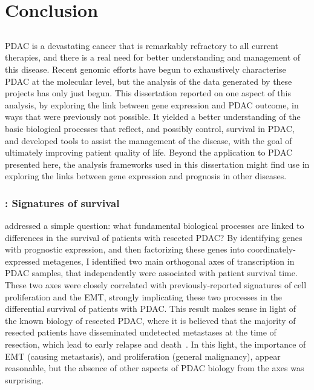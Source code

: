 \documentclass[thesis.tex]{subfiles}
\begin{document}
\chapter[Conclusion]{Conclusion}
\label{chap:conc}

\section*{}

\Acrlong{PDAC} is a devastating cancer that is remarkably refractory to all current therapies, and there is a real need for better understanding and management of this disease.  Recent genomic efforts have begun to exhaustively characterise \gls{PDAC} at the molecular level, but the analysis of the data generated by these projects has only just begun.  This dissertation reported on one aspect of this analysis, by exploring the link between gene expression and \gls{PDAC} outcome, in ways that were previously not possible.  It yielded a better understanding of the basic biological processes that reflect, and possibly control, survival in \gls{PDAC}, and developed tools to assist the management of the disease, with the goal of ultimately improving patient quality of life.  Beyond the application to \gls{PDAC} presented here, the analysis frameworks used in this dissertation might find use in exploring the links between gene expression and prognosis in other diseases.

\subsection{\texorpdfstring{}{Chapter 2}: Signatures of survival}
 addressed a simple question: what fundamental biological processes are linked to differences in the survival of patients with resected \gls{PDAC}?  By identifying genes with prognostic expression, and then factorizing these genes into coordinately-expressed metagenes, I identified two main orthogonal axes of transcription in \gls{PDAC} samples, that independently were associated with patient survival time.  These two axes were closely correlated with previously-reported signatures of cell proliferation and the \gls{EMT}, strongly implicating these two processes in the differential survival of patients with \gls{PDAC}.  This result makes sense in light of the known biology of resected \gls{PDAC}, where it is believed that the majority of resected patients have disseminated undetected metastases at the time of resection, which lead to early relapse and death~\cite{Barugola2007}.  In this light, the importance of \gls{EMT} (causing metastasis), and proliferation (general malignancy), appear reasonable, but the absence of other aspects of \gls{PDAC} biology from the axes was surprising.
\end{document}
